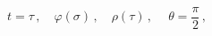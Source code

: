 \begin{equation}
t = \tau\,,\quad \varphi(\sigma)\,,\quad \rho(\tau)\,,\quad \
\theta = \frac{\pi}{2}\,, \label{configuration}
\end{equation}

